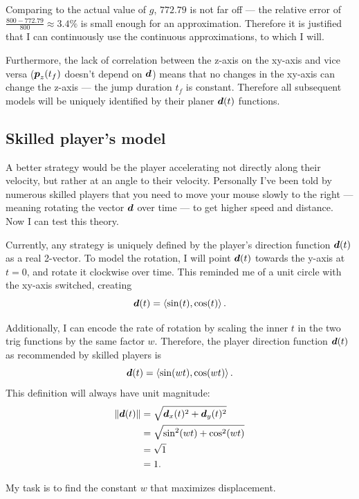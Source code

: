 Comparing to the actual value of $g$, $772.79$ is not far off --- the relative error of $\frac{800 - 772.79}{800} \approx 3.4\%$ is small enough for an approximation. Therefore it is justified that I can continuously use the continuous approximations, to which I will.

Furthermore, the lack of correlation between the z-axis on the xy-axis and vice versa ($\boldsymbol{p}_z(t_f)$ doesn't depend on $\boldsymbol{d}$) means that no changes in the xy-axis can change the z-axis --- the jump duration $t_f$ is constant. Therefore all subsequent models will be uniquely identified by their planer $\boldsymbol{d}(t)$ functions.

\subsection{Skilled player's model}
A better strategy would be the player accelerating not directly along their velocity, but rather at an angle to their velocity. Personally I've been told by numerous skilled players that you need to move your mouse slowly to the right --- meaning rotating the vector $\boldsymbol{d}$ over time --- to get higher speed and distance. Now I can test this theory.

Currently, any strategy is uniquely defined by the player's direction function $\boldsymbol{d}(t)$ as a real 2-vector. To model the rotation, I will point $\boldsymbol{d}(t)$ towards the y-axis at $t=0$, and rotate it clockwise over time. This reminded me of a unit circle with the xy-axis switched, creating
\[
    \boldsymbol{d}(t) = \left\langle \sin(t), \cos(t) \right\rangle.
\]

Additionally, I can encode the rate of rotation by scaling the inner $t$ in the two trig functions by the same factor $w$. Therefore, the player direction function $\boldsymbol{d}(t)$ as recommended by skilled players is
\[
    \boldsymbol{d}(t) = \left\langle \sin(wt), \cos(wt) \right\rangle.
\]
This definition will always have unit magnitude:
\begin{align*}
    \|\boldsymbol{d}(t)\| &= \sqrt{\boldsymbol{d}_x(t)^2 + \boldsymbol{d}_y(t)^2}\\
    &= \sqrt{\sin^2(wt) + \cos^2(wt)}\\
    &= \sqrt{1}\\
    &= 1.
\end{align*}

My task is to find the constant $w$ that maximizes displacement.


